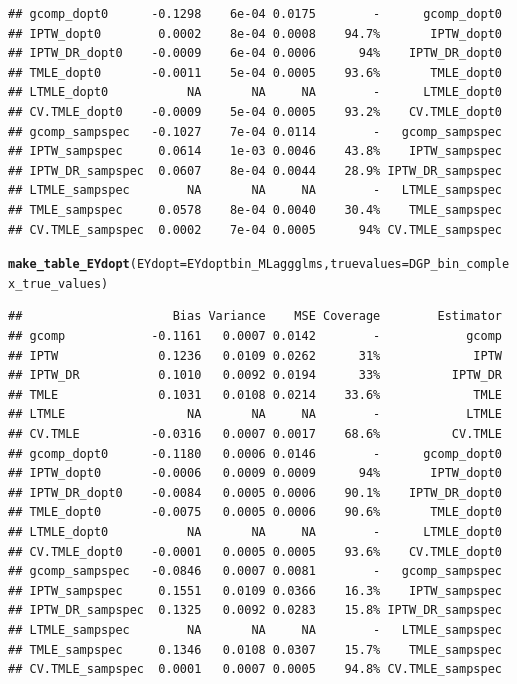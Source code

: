 \documentclass[11pt]{article}\usepackage[]{graphicx}\usepackage[]{color}
\makeatletter
\newcommand{\hlstd}[1]{\textcolor[rgb]{0.345,0.345,0.345}{#1}}%
\newcommand{\hlkwc}[1]{\textcolor[rgb]{0.333,0.667,0.333}{#1}}%
\newcommand{\hlkwd}[1]{\textcolor[rgb]{0.737,0.353,0.396}{\textbf{#1}}}%
\newenvironment{kframe}{%
 \def\at@end@of@kframe{}%
 \ifinner\ifhmode%
  \def\at@end@of@kframe{\end{minipage}}%
  \begin{minipage}{\columnwidth}%
 \fi\fi%
 \def\FrameCommand##1{\hskip\@totalleftmargin \hskip-\fboxsep
 \colorbox{shadecolor}{##1}\hskip-\fboxsep
     \hskip-\linewidth \hskip-\@totalleftmargin \hskip\columnwidth}%
 \MakeFramed {\advance\hsize-\width
   \@totalleftmargin\z@ \linewidth\hsize
   \@setminipage}}%
 {\par\unskip\endMakeFramed%
 \at@end@of@kframe}
\newenvironment{knitrout}{}{} %
\makeatother
\begin{document}
\begin{knitrout}
\begin{kframe}
\begin{verbatim}
## gcomp_dopt0      -0.1298    6e-04 0.0175        -      gcomp_dopt0
## IPTW_dopt0        0.0002    8e-04 0.0008    94.7%       IPTW_dopt0
## IPTW_DR_dopt0    -0.0009    6e-04 0.0006      94%    IPTW_DR_dopt0
## TMLE_dopt0       -0.0011    5e-04 0.0005    93.6%       TMLE_dopt0
## LTMLE_dopt0           NA       NA     NA        -      LTMLE_dopt0
## CV.TMLE_dopt0    -0.0009    5e-04 0.0005    93.2%    CV.TMLE_dopt0
## gcomp_sampspec   -0.1027    7e-04 0.0114        -   gcomp_sampspec
## IPTW_sampspec     0.0614    1e-03 0.0046    43.8%    IPTW_sampspec
## IPTW_DR_sampspec  0.0607    8e-04 0.0044    28.9% IPTW_DR_sampspec
## LTMLE_sampspec        NA       NA     NA        -   LTMLE_sampspec
## TMLE_sampspec     0.0578    8e-04 0.0040    30.4%    TMLE_sampspec
## CV.TMLE_sampspec  0.0002    7e-04 0.0005      94% CV.TMLE_sampspec
\end{verbatim}
\begin{alltt}
\hlkwd{make_table_EYdopt}\hlstd{(}\hlkwc{EYdopt} \hlstd{= EYdoptbin_MLaggglms,} \hlkwc{truevalues} \hlstd{= DGP_bin_complex_true_values)}
\end{alltt}
\begin{verbatim}
##                     Bias Variance    MSE Coverage        Estimator
## gcomp            -0.1161   0.0007 0.0142        -            gcomp
## IPTW              0.1236   0.0109 0.0262      31%             IPTW
## IPTW_DR           0.1010   0.0092 0.0194      33%          IPTW_DR
## TMLE              0.1031   0.0108 0.0214    33.6%             TMLE
## LTMLE                 NA       NA     NA        -            LTMLE
## CV.TMLE          -0.0316   0.0007 0.0017    68.6%          CV.TMLE
## gcomp_dopt0      -0.1180   0.0006 0.0146        -      gcomp_dopt0
## IPTW_dopt0       -0.0006   0.0009 0.0009      94%       IPTW_dopt0
## IPTW_DR_dopt0    -0.0084   0.0005 0.0006    90.1%    IPTW_DR_dopt0
## TMLE_dopt0       -0.0075   0.0005 0.0006    90.6%       TMLE_dopt0
## LTMLE_dopt0           NA       NA     NA        -      LTMLE_dopt0
## CV.TMLE_dopt0    -0.0001   0.0005 0.0005    93.6%    CV.TMLE_dopt0
## gcomp_sampspec   -0.0846   0.0007 0.0081        -   gcomp_sampspec
## IPTW_sampspec     0.1551   0.0109 0.0366    16.3%    IPTW_sampspec
## IPTW_DR_sampspec  0.1325   0.0092 0.0283    15.8% IPTW_DR_sampspec
## LTMLE_sampspec        NA       NA     NA        -   LTMLE_sampspec
## TMLE_sampspec     0.1346   0.0108 0.0307    15.7%    TMLE_sampspec
## CV.TMLE_sampspec  0.0001   0.0007 0.0005    94.8% CV.TMLE_sampspec
\end{verbatim}
\end{kframe}
\end{knitrout}
\end{document}
